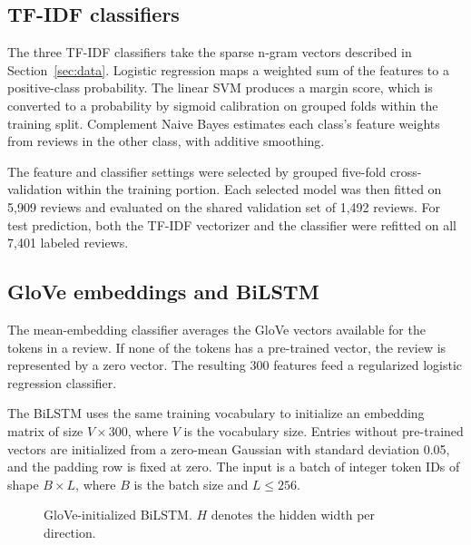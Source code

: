 \subsection{TF-IDF classifiers}

The three TF-IDF classifiers take the sparse n-gram vectors described
in Section~\ref{sec:data}. Logistic regression maps a weighted sum of the features
to a positive-class probability. The linear SVM produces a margin score,
which is converted to a probability by sigmoid calibration on grouped
folds within the training split. Complement Naive Bayes estimates
each class's feature weights from reviews in the other class, with
additive smoothing.

The feature and classifier settings were selected by grouped five-fold
cross-validation within the training portion. Each selected model was
then fitted on 5,909 reviews and evaluated on the shared validation
set of 1,492 reviews. For test prediction, both the TF-IDF vectorizer
and the classifier were refitted on all 7,401 labeled reviews.

\subsection{GloVe embeddings and BiLSTM}

The mean-embedding classifier averages the GloVe vectors available for
the tokens in a review. If none of the tokens has a pre-trained vector,
the review is represented by a zero vector. The resulting 300 features
feed a regularized logistic regression classifier.

The BiLSTM uses the same training vocabulary to initialize an
embedding matrix of size $V \times 300$, where $V$ is the vocabulary
size. Entries without pre-trained vectors are initialized from a
zero-mean Gaussian with standard deviation 0.05, and the padding row
is fixed at zero. The input is a batch of integer token IDs of shape
$B \times L$, where $B$ is the batch size and $L \leq 256$.

\begin{figure}[!htbp]
\centering
{}
\caption{GloVe-initialized BiLSTM. $H$ denotes the hidden width
per direction.}
\label{fig:bilstm}
\end{figure}


